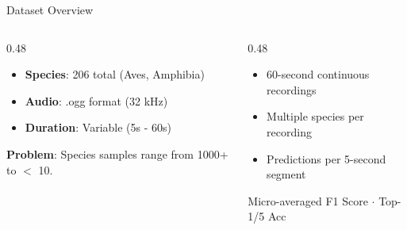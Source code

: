 \documentclass[aspectratio=169, 11pt]{beamer}
\begin{document}
\begin{frame}{Dataset Overview}
    \begin{columns}[T, onlytextwidth]
        \begin{column}{0.48\textwidth}
            \begin{tcolorbox}[draculabox={Training Data}]
                \small
                \begin{itemize}
                    \item \textbf{Species}: 206 total (Aves, Amphibia)
                    \item \textbf{Audio}: .ogg format (32 kHz)
                    \item \textbf{Duration}: Variable (5s - 60s)
                \end{itemize}
            \end{tcolorbox}

            \begin{tcolorbox}[orangebox_tcb={Class Imbalance}]
                \footnotesize \textcolor{draculared}{\textbf{Problem}}: Species samples range from 1000+ to $<$ 10.
            \end{tcolorbox}
        \end{column}
        \begin{column}{0.48\textwidth}
            \begin{tcolorbox}[draculabox={Test Data (Soundscapes)}]
                \small
                \begin{itemize}
                    \item 60-second continuous recordings
                    \item Multiple species per recording
                    \item Predictions per 5-second segment
                \end{itemize}
            \end{tcolorbox}

            \begin{tcolorbox}[greenbox_tcb={Evaluation}]
                \footnotesize Micro-averaged F1 Score $\cdot$ Top-1/5 Acc
            \end{tcolorbox}
        \end{column}
    \end{columns}
\end{frame}
\end{document}
